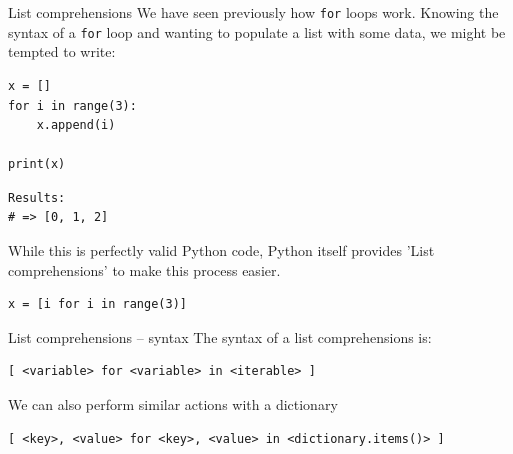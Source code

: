 \documentclass[10pt]{beamer}
\begin{document}
\begin{frame}[label={sec:orgc5071df},fragile]{List comprehensions}
 We have seen previously how \texttt{for} loops work. Knowing the syntax of a \texttt{for} loop and
wanting to populate a list with some data, we might be tempted to write:

\begin{verbatim}
x = []
for i in range(3):
    x.append(i)

print(x)
\end{verbatim}

\begin{verbatim}
Results: 
# => [0, 1, 2]
\end{verbatim}


While this is perfectly valid Python code, Python itself provides 'List
comprehensions' to make this process easier.

\begin{verbatim}
x = [i for i in range(3)]
\end{verbatim}
\end{frame}

\begin{frame}[label={sec:orgc225e82},fragile]{List comprehensions -- syntax}
 The syntax of a list comprehensions is:

\begin{verbatim}
[ <variable> for <variable> in <iterable> ]
\end{verbatim}

We can also perform similar actions with a dictionary

\begin{verbatim}
[ <key>, <value> for <key>, <value> in <dictionary.items()> ]
\end{verbatim}
\end{frame}
\end{document}
